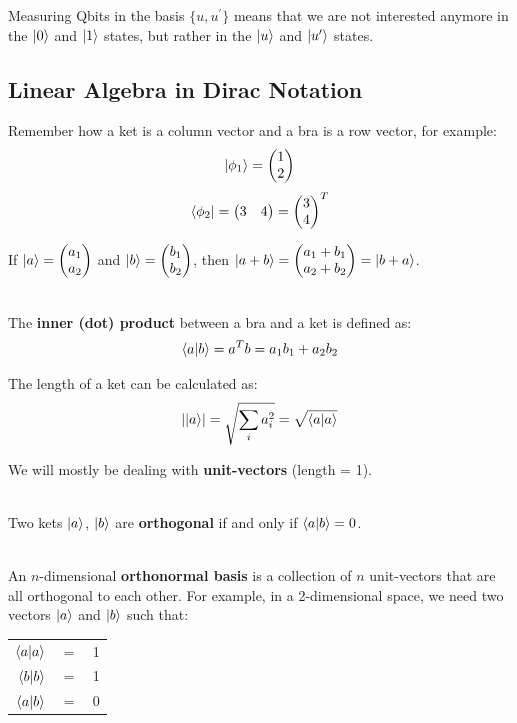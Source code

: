 \documentclass[12pt]{article}
\begin{document}
\noindent
Measuring Qbits in the basis $\{ u, u^\prime \}$ means that we are not interested anymore in the $\ket{0}$ and $\ket{1}$ states, but rather in the $\ket{u}$ and $\ket{u^\prime}$ states.

\newpage
\subsection*{Linear Algebra in Dirac Notation}
Remember how a ket is a column vector and a bra is a row vector, for example:
\[ \ket{\phi_1} = \begin{pmatrix}
    1 \\
    2
\end{pmatrix} \]
\[ \bra{\phi_2} = \begin{pmatrix}
    3 & 4
\end{pmatrix} = \begin{pmatrix}
    3 \\
    4
\end{pmatrix}^T \]

\noindent
If $\ket{a} = \begin{pmatrix}
    a_1 \\
    a_2
\end{pmatrix}$ and $\ket{b} = \begin{pmatrix}
    b_1 \\
    b_2
\end{pmatrix}$, then $\ket{a + b} = \begin{pmatrix}
    a_1 + b_1 \\
    a_2 + b_2
\end{pmatrix} = \ket{b + a}$.

\noindent
\\
The \textbf{inner (dot) product} between a bra and a ket is defined as:
\[ \braket{a | b} = a^T b = a_1b_1 + a_2b_2 \]

\noindent
The length of a ket can be calculated as:
\[ \left\lvert \ket{a} \right\rvert = \sqrt{\sum_{i} a_i^2} = \sqrt{\braket{a | a}} \]

\noindent
We will mostly be dealing with \textbf{unit-vectors} (length = 1).

\noindent
\\
Two kets $\ket{a}$, $\ket{b}$ are \textbf{orthogonal} if and only if $\braket{a | b} = 0$.

\noindent
\\
An $n$-dimensional \textbf{orthonormal basis} is a collection of $n$ unit-vectors that are all orthogonal to each other.
For example, in a 2-dimensional space, we need two vectors $\ket{a}$ and $\ket{b}$ such that:
\begin{table}[h]
    \centering
    \begin{tabular}{rcl}
    $\braket{a | a}$ & $=$ & 1  \\
    $\braket{b | b}$ & $=$ & 1 \\
    $\braket{a | b}$ & $=$ & 0
    \end{tabular}
\end{table}
\end{document}
